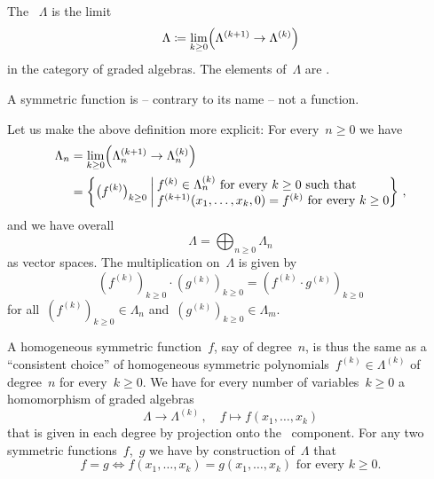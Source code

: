 \documentclass[a4paper,11pt]{scrartcl}
\begin{document}
\begin{definition}
  The ~$\Lambda$ is the limit
  \[
    \Lambda
    \coloneqq
    \lim_{k \geq 0}
    \Bigl( \Lambda^{(k+1)} \to \Lambda^{(k)} \Bigr)
  \]
  in the category of graded algebras.
  The elements of~$\Lambda$ are .
\end{definition}

\begin{warning}
  A symmetric function is -- contrary to its name -- not a function.
\end{warning}

Let us make the above definition more explicit:
For every~$n \geq 0$ we have
\begin{align*}
  \Lambda_n
  &=
  \lim_{k \geq 0}
  \Bigl( \Lambda^{(k+1)}_n \to \Lambda^{(k)}_n \Bigr)
  \\
  &=
  \left\{
    \bigl( f^{(k)} \bigr)_{k \geq 0}
    \suchthat*
    \begin{tabular}{@{}l@{}}
      $f^{(k)} \in \Lambda^{(k)}_n$ for every~$k \geq 0$ such that \\
      $f^{(k+1)}(x_1, \dotsc, x_k, 0) = f^{(k)}$ for every~$k \geq 0$
    \end{tabular}
  \right\} \,,
\end{align*}
and we have overall
\[
  \Lambda
  =
  \bigoplus_{n \geq 0} \Lambda_n
\]
as vector spaces.
The multiplication on~$\Lambda$ is given by
\[
  (f^{(k)})_{k \geq 0}
  \cdot
  (g^{(k)})_{k \geq 0}
  =
  (f^{(k)} \cdot g^{(k)})_{k \geq 0}
\]
for all~$(f^{(k)})_{k \geq 0} \in \Lambda_n$ and~$(g^{(k)})_{k \geq 0} \in \Lambda_m$.

A homogeneous symmetric function~$f$, say of degree~$n$, is thus the same as a \enquote{consistent choice} of homogeneous symmetric polynomials~$f^{(k)} \in \Lambda^{(k)}$ of degree~$n$ for every~$k \geq 0$.
We have for every number of variables~$k \geq 0$ a homomorphism of graded algebras
\[
  \Lambda \to \Lambda^{(k)} \,,
  \quad
  f \mapsto f(x_1, \dotsc, x_k)
\]
that is given in each degree by projection onto the~ component.
For any two symmetric functions~$f$,~$g$ we have by construction of~$\Lambda$ that
\[
  f = g
  \iff
  \text{$f(x_1, \dotsc, x_k) = g(x_1, \dotsc, x_k)$ for every~$k \geq 0$.}
\]
\end{document}

